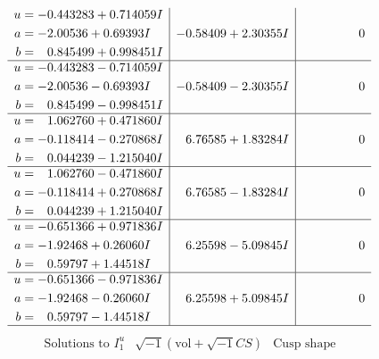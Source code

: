 \documentclass[1p]{elsarticle_modified}
\theoremstyle{definition}
\newcommand{\I}{\sqrt{-1}}
\begin{document}
$$\begin{array}{c|c|c}
\begin{aligned}
u &= -0.443283 + 0.714059 I \\
a &= -2.00536 + 0.69393 I \\
b &= \phantom{-}0.845499 + 0.998451 I\end{aligned}
 & -0.58409 + 2.30355 I & \phantom{-0.000000 } 0 \\ \hline\begin{aligned}
u &= -0.443283 - 0.714059 I \\
a &= -2.00536 - 0.69393 I \\
b &= \phantom{-}0.845499 - 0.998451 I\end{aligned}
 & -0.58409 - 2.30355 I & \phantom{-0.000000 } 0 \\ \hline\begin{aligned}
u &= \phantom{-}1.062760 + 0.471860 I \\
a &= -0.118414 - 0.270868 I \\
b &= \phantom{-}0.044239 - 1.215040 I\end{aligned}
 & \phantom{-}6.76585 + 1.83284 I & \phantom{-0.000000 } 0 \\ \hline\begin{aligned}
u &= \phantom{-}1.062760 - 0.471860 I \\
a &= -0.118414 + 0.270868 I \\
b &= \phantom{-}0.044239 + 1.215040 I\end{aligned}
 & \phantom{-}6.76585 - 1.83284 I & \phantom{-0.000000 } 0 \\ \hline\begin{aligned}
u &= -0.651366 + 0.971836 I \\
a &= -1.92468 + 0.26060 I \\
b &= \phantom{-}0.59797 + 1.44518 I\end{aligned}
 & \phantom{-}6.25598 - 5.09845 I & \phantom{-0.000000 } 0 \\ \hline\begin{aligned}
u &= -0.651366 - 0.971836 I \\
a &= -1.92468 - 0.26060 I \\
b &= \phantom{-}0.59797 - 1.44518 I\end{aligned}
 & \phantom{-}6.25598 + 5.09845 I & \phantom{-0.000000 } 0\\
 \hline 
 \end{array}$$\newpage$$\begin{array}{c|c|c}  
\text{Solutions to }I^u_{1}& \I (\text{vol} + \sqrt{-1}CS) & \text{Cusp shape}\\
 \hline 
\begin{aligned}

\end{aligned}
\end{array}$$
\end{document}
